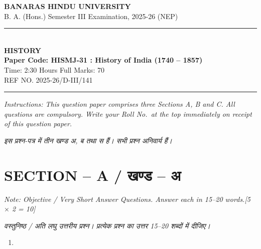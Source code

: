 \documentclass[11pt,a4paper]{article}
\newcommand{\pts}[1]{\hfill \textit{[#1]}}
\begin{document}
\begin{center}
  {\large\bfseries BANARAS HINDU UNIVERSITY}\\[2pt]
  {\normalsize B. A. (Hons.) Semester III Examination, 2025-26 (NEP)}\\[6pt]
  \rule{0.8\linewidth}{0.5pt}\\[6pt]
  {\large\bfseries HISTORY}\\[4pt]
  {\large\bfseries Paper Code: HISMJ-31 : History of India (1740 -- 1857)}\\[4pt]
  {\normalsize Time: 2:30 Hours \hfill Full Marks: 70}\\[2pt]
  {\small REF NO. 2025-26/D-III/141}
\end{center}
\rule{\linewidth}{0.4pt}
\smallskip

\noindent \textit{Instructions: This question paper comprises three Sections A, B and C. All questions are compulsory. Write your Roll No.\ at the top immediately on receipt of this question paper.}

\smallskip
\noindent \textit{इस प्रश्न-पत्र में तीन खण्ड अ, ब तथा स हैं। सभी प्रश्न अनिवार्य हैं।}

\bigskip

\section*{SECTION -- A / खण्ड -- अ}
\noindent \textit{Note: Objective / Very Short Answer Questions. Answer each in 15--20 words.}\pts{5 $\times$ 2 = 10}

\noindent \textit{वस्तुनिष्ठ / अति लघु उत्तरीय प्रश्न। प्रत्येक प्रश्न का उत्तर 15--20 शब्दों में दीजिए।}

\begin{enumerate}[label=\textbf{\arabic*.},leftmargin=*,itemsep=8pt]
  \item 
\end{enumerate}
\end{document}
